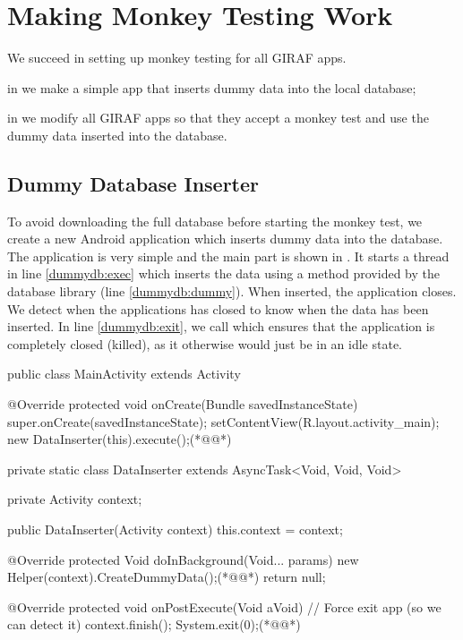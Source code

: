 \chapter{Making Monkey Testing Work}
We succeed in setting up monkey testing for all GIRAF apps.

\begin{chapterorganization}
  \item in  we make a simple app that inserts dummy data into the local database;
  \item in  we modify all GIRAF apps so that they accept a monkey test and use the dummy data inserted into the database.
\end{chapterorganization}

\section{Dummy Database Inserter}\label{sec:dummy_db_inserter}
To avoid downloading the full database before starting the monkey test, we create a new Android application which inserts dummy data into the database. The application is very simple and the main part is shown in . It starts a thread in line \ref{dummydb:exec} which inserts the data using a method provided by the database library (line \ref{dummydb:dummy}). When inserted, the application closes. We detect when the applications has closed to know when the data has been inserted. In line \ref{dummydb:exit}, we call  which ensures that the application is completely closed (killed), as it otherwise would just be in an idle state.

\begin{javacode}[caption=Dummy database inserter \mono{MainActivity} (written in Java),label=lst:dummy_db_ins_main_activity]
public class MainActivity extends Activity {
    @Override
    protected void onCreate(Bundle savedInstanceState) {
        super.onCreate(savedInstanceState);
        setContentView(R.layout.activity_main);
        new DataInserter(this).execute();(*@\label{dummydb:exec}@*)
    }

    private static class DataInserter extends AsyncTask<Void, Void, Void> {
        private Activity context;

        public DataInserter(Activity context) {
            this.context = context;
        }

        @Override
        protected Void doInBackground(Void... params) {
            new Helper(context).CreateDummyData();(*@\label{dummydb:dummy}@*)
            return null;
        }

        @Override
        protected void onPostExecute(Void aVoid) {
            // Force exit app (so we can detect it)
            context.finish();
            System.exit(0);(*@\label{dummydb:exit}@*)
        }
    }
}
\end{javacode}

